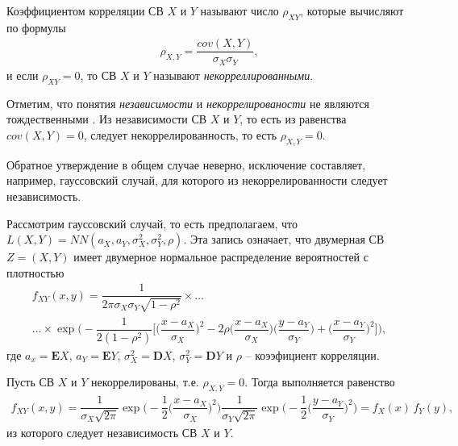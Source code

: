 \documentclass[%
	11pt,
	a4paper,
	utf8,
		]{article}
\begin{document}
Коэффициентом корреляции СВ $ X $ и $ Y $ называют число $ \rho_{XY} $, которые вычисляют по формулы
\begin{align*}
	\rho_{X, Y} = \dfrac{ cov(X, Y) }{ \sigma_X \sigma_Y },
\end{align*}
и если $ \rho_{XY} = 0 $, то СВ $ X $ и $ Y $ называют \emph{некорреллированными}.

Отметим, что понятия \emph{независимости} и \emph{некоррелированости} не являются тождественными \cite[]{shulenin:param}. Из независимости СВ $ X $ и $ Y $, то есть из равенства $ cov(X, Y) = 0 $, следует некоррелированность, то есть $ \rho_{X, Y} = 0$.

Обратное утверждение в общем случае неверно, исключение составляет, например, гауссовский случай, для которого из некоррелированности следует независимость.

Рассмотрим гауссовский случай, то есть предполагаем, что $ L(X, Y) = NN(a_X, a_Y, \sigma_X^2, \sigma_Y^2, \rho) $. Эта запись означает, что двумерная СВ $ Z = (X, Y) $ имеет двумерное нормальное распределение вероятностей с плотностью \cite[]{shulenin:param}
\begin{multline*}
	f_{XY}(x, y) = \dfrac{1}{ 2 \pi \sigma_X\sigma_Y \sqrt{1 - \rho^2}} \times \ldots\\
	\ldots \times \exp \Bigg( - \dfrac{1}{ 2(1 - \rho^2) }  \bigg[ \bigg( \dfrac{x - a_X}{\sigma_X} \bigg)^2 - 2 \rho \bigg( \dfrac{x - a_X}{\sigma_X} \bigg) \bigg( \dfrac{y - a_Y}{\sigma_Y} \bigg) + \bigg( \dfrac{x - a_Y}{\sigma_Y} \bigg)^2 \bigg] \Bigg),
\end{multline*}
где $ a_x = \mathbf{E}X $, $ a_Y = \mathbf{E}Y $, $ \sigma_X^2 = \mathbf{D}X $, $ \sigma_Y^2 = \mathbf{D}Y $ и $ \rho $ -- коээфициент корреляции.

Пусть СВ $ X $ и $ Y $ некоррелированы, т.е. $ \rho_{X, Y} = 0 $. Тогда выполняется равенство
\begin{align*}
	f_{XY}(x, y) = \dfrac{ 1 }{ \sigma_X \sqrt{2 \pi} } \exp \Bigg( - \dfrac{1}{2} \bigg( \dfrac{x - a_X}{\sigma_X} \bigg)^2 \Bigg) \dfrac{ 1 }{ \sigma_Y \sqrt{2 \pi} } \exp \Bigg( - \dfrac{1}{2} \bigg( \dfrac{y - a_Y}{\sigma_Y} \bigg)^2 \Bigg) = f_X(x) \, f_Y(y),
\end{align*}
из которого следует независимость СВ $ X $ и $ Y $.
\end{document}
